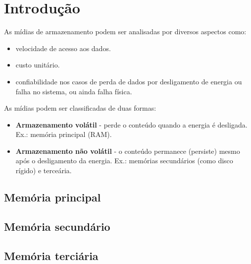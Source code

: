 \chapter{Introdução}

As mídias de armazenamento podem ser analisadas por diversos aspectos como:
\begin{itemize}
\item velocidade de acesso aos dados.
\item custo unitário.
\item confiabilidade nos casos de perda de dados por desligamento de energia
ou falha no sistema, ou ainda falha física.
\end{itemize}

As mídias podem ser classificadas de duas formas:
\begin{itemize}
\item {\bf Armazenamento volátil} - perde o conteúdo quando a energia é desligada.
Ex.: memória principal (RAM).
\item {\bf Armazenamento não volátil} - o conteúdo permanece (persiste) mesmo após
o desligamento da energia.
Ex.: memórias secundários (como disco rígido) e terceária.
\end{itemize}

\section{Memória principal}


\section{Memória secundário}

\section{Memória terciária}

